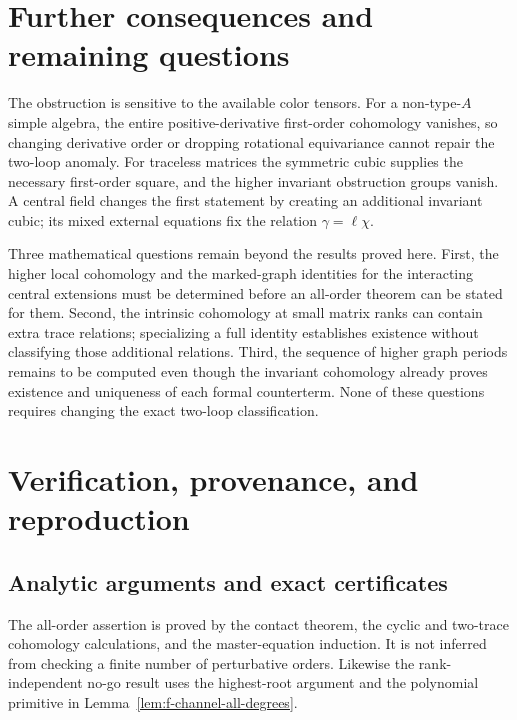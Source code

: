 \section{Further consequences and remaining questions}

The obstruction is sensitive to the available color tensors.
For a non-type-$A$ simple algebra, the
entire positive-derivative first-order cohomology vanishes,
so changing derivative order or dropping rotational
equivariance cannot repair the two-loop anomaly.
For traceless matrices the symmetric cubic supplies the
necessary first-order square, and the higher invariant
obstruction groups vanish. A central field changes the first
statement by creating an additional invariant cubic; its
mixed external equations fix the relation
$\gamma=\ell\chi$.

Three mathematical questions remain beyond the results
proved here. First, the higher local cohomology and the
marked-graph identities for the interacting central
extensions must be determined before an all-order theorem
can be stated for them. Second, the intrinsic cohomology
at small matrix ranks can contain extra trace relations;
specializing a full identity establishes existence without
classifying those additional relations. Third, the sequence
of higher graph periods remains to be computed even though
the invariant cohomology already proves existence and
uniqueness of each formal counterterm. None of these
questions requires changing the exact two-loop classification.

\appendix
\section{Verification, provenance, and reproduction}
\label{sec:verification}

\subsection{Analytic arguments and exact certificates}

The all-order assertion is proved by the contact theorem,
the cyclic and two-trace cohomology calculations, and the
master-equation induction. It is not inferred from checking
a finite number of perturbative orders. Likewise the
rank-independent no-go result uses the highest-root argument
and the polynomial primitive in
Lemma~\ref{lem:f-channel-all-degrees}.

